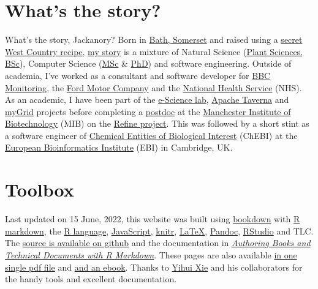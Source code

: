 \documentclass[
  12pt,
]{book}
\begin{document}
\hypertarget{whats-the-story}{%
\section*{What's the story?}\label{whats-the-story}}

What's the story, Jackanory? Born in \href{https://en.wikipedia.org/wiki/Bath,_Somerset}{Bath, Somerset} and raised using a \href{https://en.wikipedia.org/wiki/West_Country}{secret West Country recipe}, \href{https://uk.linkedin.com/in/duncanhull}{my story} is a mixture of Natural Science (\href{https://speakerdeck.com/dullhunk/why-study-plants}{Plant Sciences, BSc}), Computer Science (\href{mastersofscience.html}{MSc} \& \href{https://ethos.bl.uk/OrderDetails.do?uin=uk.bl.ethos.497578}{PhD}) and software engineering. Outside of academia, I've worked as a consultant and software developer for \href{https://en.wikipedia.org/wiki/BBC_Monitoring}{BBC Monitoring}, the \href{https://en.wikipedia.org/wiki/Ford_Motor_Company}{Ford Motor Company} and the \href{https://en.wikipedia.org/wiki/National_Health_Service}{National Health Service} (NHS). As an academic, I have been part of the \href{https://esciencelab.org.uk/}{e-Science lab}, \href{https://en.wikipedia.org/wiki/Apache_Taverna}{Apache Taverna} and \href{https://en.wikipedia.org/wiki/MyGrid}{myGrid} projects before completing a \href{https://en.wikipedia.org/wiki/Postdoctoral_researcher}{postdoc} at the \href{https://www.mib.manchester.ac.uk/}{Manchester Institute of Biotechnology} (MIB) on the \href{http://www.nactem.ac.uk/pathtext/}{Refine project}. This was followed by a short stint as a software engineer of \href{https://en.wikipedia.org/wiki/ChEBI}{Chemical Entities of Biological Interest} (ChEBI) at the \href{https://en.wikipedia.org/wiki/European_Bioinformatics_Institute}{European Bioinformatics Institute} (EBI) in Cambridge, UK. 🧬🇪🇺

\hypertarget{toolbox}{%
\section*{Toolbox}\label{toolbox}}

Last updated on 15 June, 2022, this website was built using \href{https://bookdown.org}{bookdown} with \href{https://rmarkdown.rstudio.com/}{R markdown}, the \href{https://en.wikipedia.org/wiki/R_(programming_language)}{R language}, \href{https://en.wikipedia.org/wiki/JavaScript}{JavaScript}, \href{https://en.wikipedia.org/wiki/Knitr}{knitr}, \href{https://latex4year1.netlify.app}{LaTeX}, \href{https://pandoc.org/}{Pandoc}, \href{https://rstudio.com/}{RStudio} and TLC. The \href{https://github.com/dullhunk/duncanome}{source is available on github} and the documentation in \emph{\href{https://bookdown.org/yihui/bookdown/}{Authoring Books and Technical Documents with R Markdown}}. These pages are also available \href{https://personalpages.manchester.ac.uk/staff/duncan.hull/duncan-hull.pdf}{in one single pdf file} and \href{https://personalpages.manchester.ac.uk/staff/duncan.hull/duncan-hull.epub}{and an ebook}. Thanks to \href{https://en.wikipedia.org/wiki/Yihui_Xie}{Yihui Xie} and his collaborators for the handy tools and excellent documentation. 🙏
\end{document}
